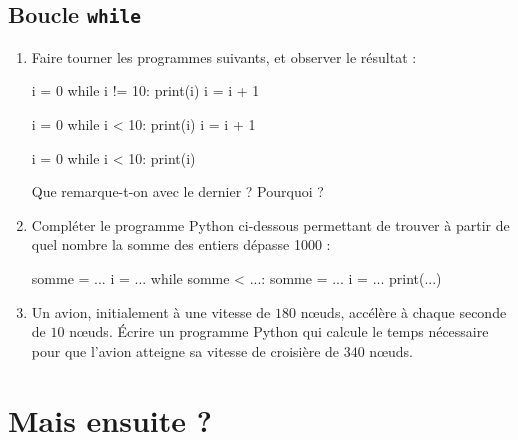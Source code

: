 \documentclass[12pt,a4paper, oneside]{article}
\theoremstyle{definition}
\begin{document}
   \subsection{Boucle \texttt{while}}\label{subsec:boucle-texttt-while}
      \begin{enumerate}
         \item Faire tourner les programmes suivants, et observer le résultat :

         \begin{minipage}{.3\textwidth}
           \begin{pyverbatim}
    i = 0
    while i != 10:
      print(i)
      i = i + 1
           \end{pyverbatim}
        \end{minipage}
         \begin{minipage}{.3\textwidth}
            \begin{pyverbatim}
    i = 0
    while i < 10:
      print(i)
      i = i + 1
           \end{pyverbatim}
        \end{minipage}
         \begin{minipage}{.3\textwidth}
            \begin{pyverbatim}
     i = 0
     while i < 10:
       print(i)
            \end{pyverbatim}
         \end{minipage}

         Que remarque-t-on  avec le dernier ?
         Pourquoi ?
         \item Compléter le programme Python ci-dessous permettant de trouver à partir de quel nombre la somme des entiers dépasse 1000 :
            \begin{pyverbatim}
              somme = ...
              i = ...
              while somme < ...:
                somme = ...
                i = ...
              print(...)
            \end{pyverbatim}

         \item Un avion, initialement à une vitesse de $180$ n\oe uds, accélère à chaque seconde de $10$ n\oe uds.
         Écrire un programme Python qui calcule le temps nécessaire pour que l'avion atteigne sa vitesse de croisière de $340$ n\oe uds.
      \end{enumerate}

\section{Mais ensuite ?}\label{sec:mais-ensuite-?}
\end{document}
